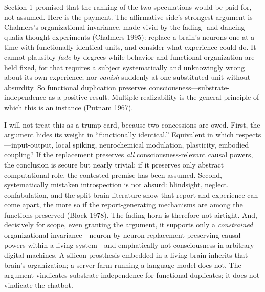 \documentclass[11pt]{article}
\begin{document}
Section 1 promised that the ranking of the two speculations would be paid for, not assumed. Here is the payment. The affirmative side's strongest argument is Chalmers's organizational invariance, made vivid by the fading- and dancing-qualia thought experiments (Chalmers 1995): replace a brain's neurons one at a time with functionally identical units, and consider what experience could do. It cannot plausibly \emph{fade} by degrees while behavior and functional organization are held fixed, for that requires a subject systematically and unknowingly wrong about its own experience; nor \emph{vanish} suddenly at one substituted unit without absurdity. So functional duplication preserves consciousness---substrate-independence as a positive result. Multiple realizability is the general principle of which this is an instance (Putnam 1967).

I will not treat this as a trump card, because two concessions are owed. First, the argument hides its weight in ``functionally identical.'' Equivalent in which respects---input-output, local spiking, neurochemical modulation, plasticity, embodied coupling? If the replacement preserves \emph{all} consciousness-relevant causal powers, the conclusion is secure but nearly trivial; if it preserves only abstract computational role, the contested premise has been assumed. Second, systematically mistaken introspection is not absurd: blindsight, neglect, confabulation, and the split-brain literature show that report and experience can come apart, the more so if the report-generating mechanisms are among the functions preserved (Block 1978). The fading horn is therefore not airtight. And, decisively for scope, even granting the argument, it supports only a \emph{constrained} organizational invariance---neuron-by-neuron replacement preserving causal powers within a living system---and emphatically not consciousness in arbitrary digital machines. A silicon prosthesis embedded in a living brain inherits that brain's organization; a server farm running a language model does not. The argument vindicates substrate-independence for functional duplicates; it does not vindicate the chatbot.
\end{document}
